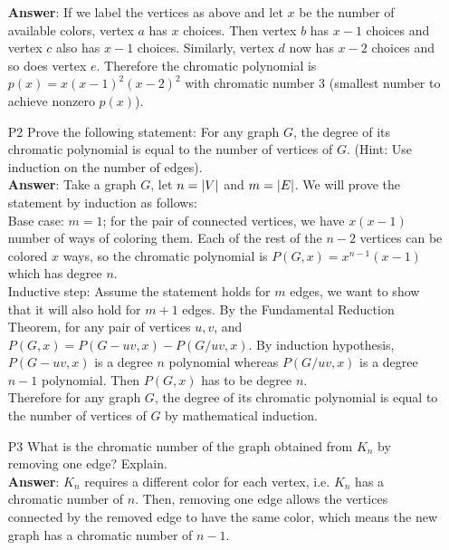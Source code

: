\documentclass{article}
\begin{document}
\begin{itemize}
            \textbf{Answer}: If we label the vertices as above and let $x$ be the number of available colors, vertex $a$ has $x$ choices. Then vertex $b$ has $x-1$ choices and vertex $c$ also has $x-1$ choices. Similarly, vertex $d$ now has $x-2$ choices and so does vertex $e$. Therefore the chromatic polynomial is $p(x)=x(x-1)^2(x-2)^2$ with chromatic number $3$ (smallest number to achieve nonzero $p(x)$).
      \item [P2] Prove the following statement: For any graph $G$, the degree of its chromatic polynomial is equal to the number of vertices of $G$. (Hint: Use induction on the number of edges).\\
            \textbf{Answer}: Take a graph $G$, let $n=\abs{V}$ and $m=\abs{E}$. We will prove the statement by induction as follows:\\
            Base case: $m=1$; for the pair of connected vertices, we have $x(x-1)$ number of ways of coloring them. Each of the rest of the $n-2$ vertices can be colored $x$ ways, so the chromatic polynomial is $P(G,x)=x^{n-1}(x-1)$ which has degree $n$.\\
            Inductive step: Assume the statement holds for $m$ edges, we want to show that it will also hold for $m+1$ edges. By the Fundamental Reduction Theorem, for any pair of vertices $u,v$, and $P(G,x)=P(G-uv,x)-P(G/uv,x)$. By induction hypothesis, $P(G-uv,x)$ is a degree $n$ polynomial whereas $P(G/uv,x)$ is a degree $n-1$ polynomial. Then $P(G,x)$ has to be degree $n$.\\
            Therefore for any graph $G$, the degree of its chromatic polynomial is equal to the number of vertices of $G$ by mathematical induction.
      \item [P3] What is the chromatic number of the graph obtained from $K_n$ by removing one edge? Explain.\\
            \textbf{Answer}: $K_n$ requires a different color for each vertex, i.e. $K_n$ has a chromatic number of $n$. Then, removing one edge allows the vertices connected by the removed edge to have the same color, which means the new graph has a chromatic number of $n-1$.
\end{itemize}
\end{document}

